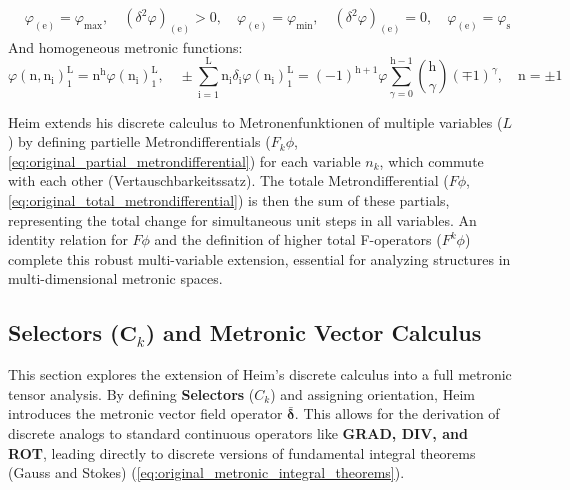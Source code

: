 \documentclass[12pt]{article}
\begin{document}
\begin{itemize}
\begin{equation}
\begin{aligned}
    & \varphi_{(\mathrm{e})} = \varphi_{\mathrm{max}}, \quad \left(\delta^2\varphi\right)_{(\mathrm{e})} > 0, \quad \varphi_{(\mathrm{e})} = \varphi_{\mathrm{min}}, \quad \left(\delta^2\varphi\right)_{(\mathrm{e})} = 0, \quad \varphi_{(\mathrm{e})} = \varphi_{\mathrm{s}}
    \end{aligned} \tag{76}
    \end{equation}
    And homogeneous metronic functions:
    \begin{equation}
    \varphi(\mathrm{n}, \mathrm{n_i})_1^\mathrm{L} = \mathrm{n}^\mathrm{h}\varphi(\mathrm{n_i})_1^\mathrm{L}, \quad \pm \sum_{\mathrm{i=1}}^\mathrm{L} \mathrm{n_i} \delta_{\mathrm{i}}\varphi(\mathrm{n_i})_1^\mathrm{L} = (-1)^{\mathrm{h+1}} \varphi \sum_{\gamma=0}^{\mathrm{h-1}} \binom{\mathrm{h}}{\gamma} (\mp 1)^\gamma, \quad \mathrm{n} = \pm 1 \tag{77}
    \end{equation}
\end{itemize}

Heim extends his discrete calculus to Metronenfunktionen of multiple variables (\(L\)) by defining partielle Metrondifferentials (\(F_k\phi\), \eqref{eq:original_partial_metrondifferential}) for each variable \(n_k\), which commute with each other (Vertauschbarkeitssatz). The totale Metrondifferential (\(F\phi\), \eqref{eq:original_total_metrondifferential}) is then the sum of these partials, representing the total change for simultaneous unit steps in all variables. An identity relation for \(F\phi\) and the definition of higher total F-operators (\(F^k\phi\)) complete this robust multi-variable extension, essential for analyzing structures in multi-dimensional metronic spaces.


\subsection{Selectors (\texorpdfstring{\( \mathbf{C}_k \)}{C\_k}) and Metronic Vector Calculus}
\label{sec:selectors_vector_calculus}

This section explores the extension of Heim's discrete calculus into a full metronic tensor analysis. By defining \textbf{Selectors} (\(C_k\)) and assigning orientation, Heim introduces the metronic vector field operator \(\bar{\bm{\delta}}\). This allows for the derivation of discrete analogs to standard continuous operators like \textbf{GRAD, DIV, and ROT}, leading directly to discrete versions of fundamental integral theorems (Gauss and Stokes) (\eqref{eq:original_metronic_integral_theorems}).
\end{document}
